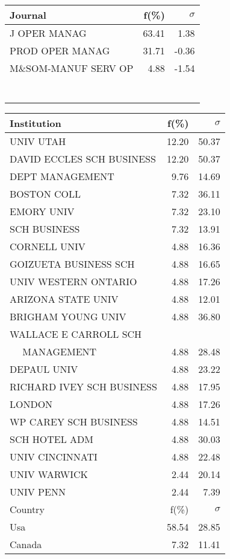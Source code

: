 \documentclass[a4paper,11pt]{report}
\begin{document}
\begin{landscape}
\begin{table}[!ht]
{\begin{tabular}{|l r  r|}
\hline
\hline
Journal & f(\%) & $\sigma$\\
\hline
J OPER MANAG & 63.41 & 1.38\\
PROD OPER MANAG & 31.71 & -0.36\\
M\&SOM-MANUF SERV OP & 4.88 & -1.54\\
 &  & \\
 &  & \\
 &  & \\
 &  & \\
 &  & \\
 &  & \\
 &  & \\
\hline
\end{tabular}
}
{\scriptsize\begin{tabular}{|l r r|}
\hline
Institution & f(\%) & $\sigma$\\
\hline
UNIV UTAH & 12.20 & 50.37\\
DAVID ECCLES SCH BUSINESS & 12.20 & 50.37\\
DEPT MANAGEMENT & 9.76 & 14.69\\
BOSTON COLL & 7.32 & 36.11\\
EMORY UNIV & 7.32 & 23.10\\
SCH BUSINESS & 7.32 & 13.91\\
CORNELL UNIV & 4.88 & 16.36\\
GOIZUETA BUSINESS SCH & 4.88 & 16.65\\
UNIV WESTERN ONTARIO & 4.88 & 17.26\\
ARIZONA STATE UNIV & 4.88 & 12.01\\
BRIGHAM YOUNG UNIV & 4.88 & 36.80\\
WALLACE E CARROLL SCH &  & \\
$\quad$ MANAGEMENT & 4.88 & 28.48\\
DEPAUL UNIV & 4.88 & 23.22\\
RICHARD IVEY SCH BUSINESS & 4.88 & 17.95\\
LONDON & 4.88 & 17.26\\
WP CAREY SCH BUSINESS & 4.88 & 14.51\\
SCH HOTEL ADM & 4.88 & 30.03\\
UNIV CINCINNATI & 4.88 & 22.48\\
UNIV WARWICK & 2.44 & 20.14\\
UNIV PENN & 2.44 & 7.39\\
\hline
\hline
Country & f(\%) & $\sigma$\\
\hline
Usa & 58.54 & 28.85\\
Canada & 7.32 & 11.41\\

\end{tabular}}
\end{table}
\end{landscape}
\end{document}
